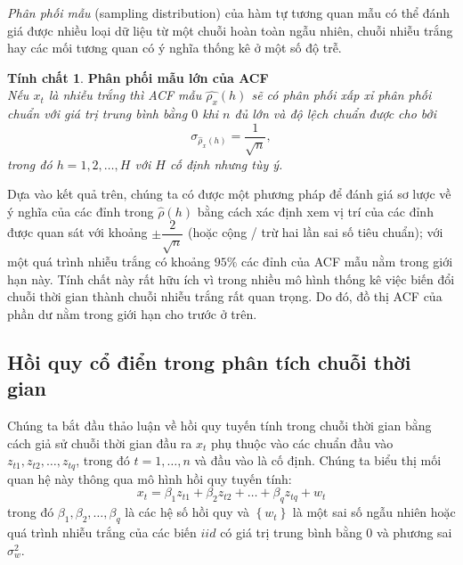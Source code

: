 \documentclass[12pt, a4paper,oneside]{book}
\theoremstyle{definition}
\newtheorem{tc}[theo]{Tính chất}
\begin{document}
\textit{Phân phối mẫu }(sampling distribution) của hàm tự tương quan mẫu có thể đánh giá được nhiều loại dữ liệu từ một chuỗi hoàn toàn ngẫu nhiên, chuỗi nhiễu trắng hay các mối tương quan có ý nghĩa thống kê ở một số độ trễ.

\begin{tc}\cite{8} \textbf{Phân phối mẫu lớn của ACF}\\
	\textit{Nếu $ x_{t}$ là nhiễu trắng thì ACF mẫu $\widehat{\rho_{x}}(h)$ sẽ có phân phối xấp xỉ phân phối chuẩn với giá trị trung bình bằng $0$  khi $n$ đủ lớn và độ lệch chuẩn được cho bởi
		\begin{equation}
		\sigma_{\hat{\rho}_{x}(h)}=\dfrac{1}{\sqrt{n}}, \label{ct1.40}
		\end{equation}
		trong đó $h = 1, 2, \dots, H$ với $H$ cố định nhưng tùy ý.}
\end{tc}
Dựa vào kết quả trên, chúng ta có được một phương pháp để đánh giá sơ lược về ý nghĩa của các đỉnh trong $\widehat{\rho}(h)$ bằng cách xác định xem vị trí của các đỉnh được quan sát với khoảng $\pm\dfrac{2}{\sqrt{n}}$ (hoặc cộng / trừ hai lần sai số tiêu chuẩn); với một quá trình nhiễu trắng có khoảng $95\%$ các đỉnh của ACF mẫu nằm trong giới hạn này. Tính chất này rất hữu ích vì trong nhiều mô hình thống kê việc biến đổi chuỗi thời gian thành chuỗi nhiễu trắng rất quan trọng. Do đó, đồ thị  ACF của phần dư nằm trong giới hạn cho trước ở trên.
\subsection{\label{hqcd}Hồi quy cổ điển trong phân tích chuỗi thời gian}
Chúng ta bắt đầu thảo luận về hồi quy tuyến tính trong chuỗi thời gian bằng cách giả sử chuỗi thời gian đầu ra $x_{t}$ phụ thuộc vào các chuẩn đầu vào $z_{t1}, z_{t2}, \dots, z_{tq}$, trong đó $t=1, \dots, n$ và đầu vào là cố định. Chúng ta biểu thị mối quan hệ này thông qua mô hình hồi quy tuyến tính:
\begin{equation}
x_{t}=\beta_{1}z_{t1} + \beta_{2}z_{t2} + \dots+ \beta_{q}z_{tq} +w_{t} \label{ct1.44}
\end{equation}
trong đó $\beta_{1}, \beta_{2}, \dots, \beta_{q}$ là các hệ số hồi quy và $\left\lbrace w_{t} \right\rbrace$ là một sai số ngẫu nhiên hoặc quá trình nhiễu trắng của các biến $iid$ có giá trị trung bình bằng $0$ và phương sai $\sigma_{w}^{2} $.
\end{document}

